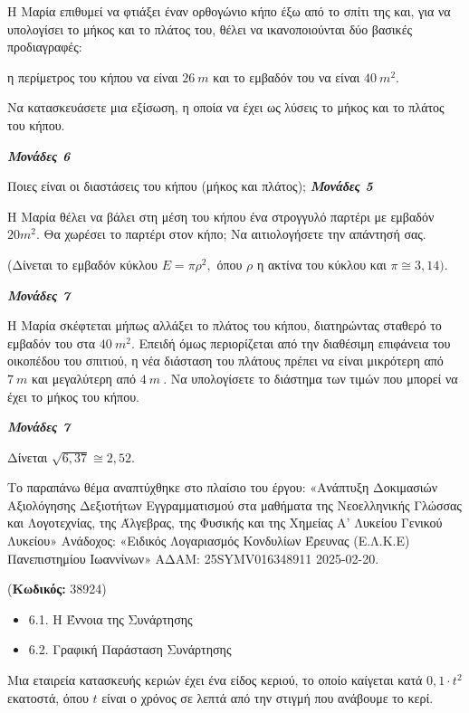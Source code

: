 \documentclass[11pt,a4paper,twoside]{book}
\newcounter{askhsh}[chapter]
\renewcommand{\theaskhsh}{
	\bf{\titlefont{\Large{\thechapter}}.\arabic{askhsh}}
}
\newcommand{\Askhsh}[2]{\refstepcounter{askhsh}{\titlefont{Άσκηση\theaskhsh} - \textcolor{maincolor}{ΘΕΜΑ #2}} ({\small{\textbf{Κωδικός:} #1}})\\}{}
\newenvironment{ylh}{
\begin{tcolorbox}[
breakable,
enhanced standard,
titlerule=0pt,
toprule=0pt, 
rightrule=0pt, 
bottomrule=0pt,
title={\titlefont Ύλη άσκησης},
colback=white,
opacityback=0,
left=2mm,
top=1mm,
bottom=0mm,
boxrule=0pt,
colframe=white,
borderline west={1.5mm}{0pt}{secondarycolor},
leftrule=2mm,
sharp corners,
coltitle=black
]
\begin{itemize}[leftmargin=3mm, itemsep=0mm, label=\textcolor{secondarycolor}{{\small\faBook}}]
}{
\end{itemize}
\end{tcolorbox}
}
\newcommand{\monades}[1]{
\hspace*{\fill}
\textbf{\textit{\textcolor{maincolor}{Μονάδες #1}}}}
\begin{document}
Η Μαρία επιθυμεί να φτιάξει έναν ορθογώνιο κήπο έξω από το σπίτι της και, για να υπολογίσει το μήκος και το πλάτος του, θέλει να ικανοποιούνται δύο βασικές προδιαγραφές:

η περίμετρος του κήπου να είναι $26\ m$ και το εμβαδόν του να είναι $40{\ m}^{2}$.

\begin{alist}
\item Να κατασκευάσετε μια εξίσωση, η οποία να έχει ως λύσεις το μήκος και το πλάτος του κήπου.
\monades{6}
\item Ποιες είναι οι διαστάσεις του κήπου (μήκος και πλάτος);\monades{5}
\item Η Μαρία θέλει να βάλει στη μέση του κήπου ένα στρογγυλό παρτέρι με εμβαδόν $20m^{2}$. Θα χωρέσει το παρτέρι στον κήπο; Να αιτιολογήσετε την απάντησή σας.

(Δίνεται το εμβαδόν κύκλου $Ε = \pi\rho^{2},$ όπου $\rho$ η ακτίνα του κύκλου και $\pi \cong 3,14)$.
\monades{7}
\item Η Μαρία σκέφτεται μήπως αλλάξει το πλάτος του κήπου, διατηρώντας σταθερό το εμβαδόν του στα $40\ m^{2}$. Επειδή όμως περιορίζεται από την διαθέσιμη επιφάνεια του οικοπέδου του σπιτιού, η νέα διάσταση του πλάτους πρέπει να είναι μικρότερη από $7\ m$ και μεγαλύτερη από $4\ m\ .$ Να υπολογίσετε το διάστημα των τιμών που μπορεί να έχει το μήκος του κήπου.
\monades{7}

Δίνεται $\sqrt{6,37} \cong 2,52$.

{\footnotesize Το παραπάνω θέμα αναπτύχθηκε στο πλαίσιο του έργου: «Ανάπτυξη Δοκιμασιών Αξιολόγησης Δεξιοτήτων Εγγραμματισμού στα μαθήματα της Νεοελληνικής Γλώσσας και Λογοτεχνίας, της Άλγεβρας, της Φυσικής και της Χημείας Α' Λυκείου Γενικού Λυκείου» Ανάδοχος: «Ειδικός Λογαριασμός Κονδυλίων Έρευνας (Ε.Λ.Κ.Ε) Πανεπιστημίου Ιωαννίνων» ΑΔΑΜ: 25SYMV016348911 2025-02-20.}
\end{alist}

\vspace{4mm}
\Askhsh{38924}{4}
\begin{ylh}
    \item 6.1. Η Έννοια της Συνάρτησης
    \item 6.2. Γραφική Παράσταση Συνάρτησης
\end{ylh}

Μια εταιρεία κατασκευής κεριών έχει ένα είδος κεριού, το οποίο καίγεται κατά $0,1 \cdot t^{2}$ εκατοστά, όπου $t$ είναι ο χρόνος σε λεπτά από την στιγμή που ανάβουμε το κερί.
\end{document}
